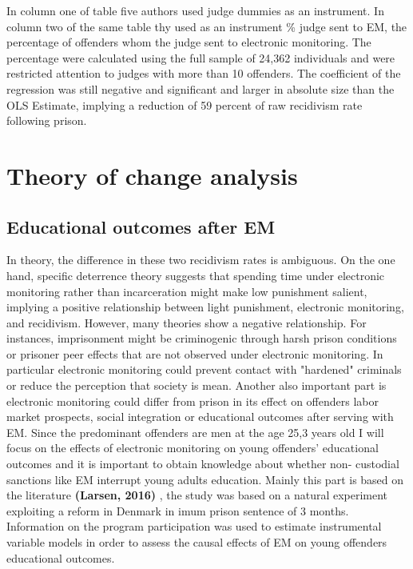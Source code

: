 \documentclass[a4paper,12pt]{article}
\begin{document}
In column one of table five authors used judge dummies as an instrument. In column two of the same table thy used as an instrument \% judge sent to EM, the percentage of offenders whom the judge sent to electronic monitoring. The percentage were calculated using the full sample of 24,362 individuals and were restricted attention to judges with more than 10 offenders. The coefficient of the regression was still negative and significant and larger in absolute size than the OLS Estimate, implying a reduction of 59 percent of raw recidivism rate following prison. 



\newpage
\section{Theory of change analysis}
\subsection{Educational outcomes after EM}
In theory, the difference in these two recidivism rates is ambiguous. On the one hand, specific deterrence theory suggests that spending time under electronic monitoring rather than incarceration might make low punishment salient, implying a positive relationship between light punishment, electronic monitoring, and recidivism. However, many theories show a negative relationship. For instances, imprisonment might be criminogenic through harsh prison conditions or prisoner peer effects that are not observed under electronic monitoring. In particular electronic monitoring could prevent contact with "hardened" criminals or reduce the perception that society is mean. Another also important part is electronic monitoring could differ from prison in its effect on offenders labor market prospects, social integration or educational outcomes after serving with EM. Since the predominant offenders are men at the age 25,3 years old I will focus on the effects of electronic monitoring on young offenders' educational outcomes and it is important to obtain knowledge about whether non- custodial sanctions like EM interrupt young adults education. Mainly this part is based on the literature \textbf{(Larsen, 2016)} \cite{Larsen2017}, the study was based on a natural experiment exploiting a reform in Denmark in imum prison sentence of 3 months. Information on the program participation was used to estimate instrumental variable models in order to assess the causal effects of EM on young offenders educational outcomes. 
\end{document}
